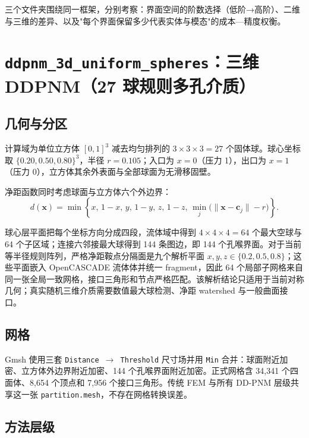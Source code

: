 \documentclass[11pt,a4paper]{ctexart}
\newcommand{\Dd}{DDPNM}
\begin{document}
三个文件夹围绕同一框架，分别考察：界面空间的阶数选择（低阶→高阶）、二维与三维的差异、以及"每个界面保留多少代表实体与模态"的成本—精度权衡。

\newpage
\section{\texttt{ddpnm\_3d\_uniform\_spheres}：三维 \Dd{}（27 球规则多孔介质）}
\label{sec:3d}

\subsection{几何与分区}
\label{sec:3d-geometry}

计算域为单位立方体 $[0,1]^3$ 减去均匀排列的 $3\times3\times3=27$ 个固体球。球心坐标取 $\{0.20,0.50,0.80\}^3$，半径 $r=0.105$；入口为 $x=0$（压力 1），出口为 $x=1$（压力 0），立方体其余外表面与全部球面为无滑移固壁。

净距函数同时考虑球面与立方体六个外边界：
\begin{equation}
  d(\boldsymbol{x})=\min\left\{x,\,1-x,\,y,\,1-y,\,z,\,1-z,\,
  \min_j\bigl(\|\boldsymbol{x}-\boldsymbol{c}_j\|-r\bigr)\right\}.
\end{equation}

球心层平面把每个坐标方向分成四段，流体域中得到 $4\times4\times4=64$ 个最大空球与 64 个子区域；连接六邻接最大球得到 144 条图边，即 144 个孔喉界面。对于当前等半径规则阵列，严格净距鞍点分隔面是九个解析平面 $x,y,z\in\{0.2,0.5,0.8\}$；这些平面嵌入 OpenCASCADE 流体体并统一 fragment，因此 64 个局部子网格来自同一张全局一致网格，接口三角形和节点严格匹配。该解析结论只适用于当前对称几何；真实随机三维介质需要数值最大球检测、净距 watershed 与一般曲面接口。

\subsection{网格}
\label{sec:3d-mesh}

Gmsh 使用三套 \texttt{Distance $\to$ Threshold} 尺寸场并用 \texttt{Min} 合并：球面附近加密、立方体外边界附近加密、144 个孔喉界面附近加密。正式网格含 34{,}341 个四面体、8{,}654 个顶点和 7{,}956 个接口三角形。传统 FEM 与所有 DD-PNM 层级共享这一张 \texttt{partition.mesh}，不存在网格转换误差。

\subsection{方法层级}
\label{sec:3d-hierarchy}
\end{document}
